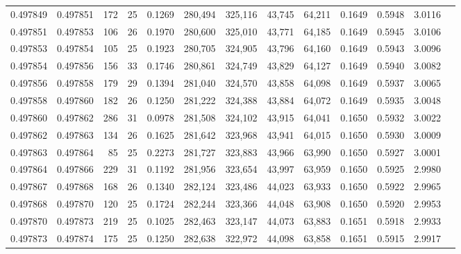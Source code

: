 \begin{tabular}{rrrrrrrrrrrrr}
0.497849 & 0.497851 & 172 &  25 &                                     0.1269 & 280,494 & 325,116 &  43,745 &  64,211 & 0.1649 & 0.5948 & 3.0116 \\
0.497851 & 0.497853 & 106 &  26 &                                     0.1970 & 280,600 & 325,010 &  43,771 &  64,185 & 0.1649 & 0.5945 & 3.0106 \\
0.497853 & 0.497854 & 105 &  25 &                                     0.1923 & 280,705 & 324,905 &  43,796 &  64,160 & 0.1649 & 0.5943 & 3.0096 \\
0.497854 & 0.497856 & 156 &  33 &                                     0.1746 & 280,861 & 324,749 &  43,829 &  64,127 & 0.1649 & 0.5940 & 3.0082 \\
0.497856 & 0.497858 & 179 &  29 &                                     0.1394 & 281,040 & 324,570 &  43,858 &  64,098 & 0.1649 & 0.5937 & 3.0065 \\
0.497858 & 0.497860 & 182 &  26 &                                     0.1250 & 281,222 & 324,388 &  43,884 &  64,072 & 0.1649 & 0.5935 & 3.0048 \\
0.497860 & 0.497862 & 286 &  31 &                                     0.0978 & 281,508 & 324,102 &  43,915 &  64,041 & 0.1650 & 0.5932 & 3.0022 \\
0.497862 & 0.497863 & 134 &  26 &                                     0.1625 & 281,642 & 323,968 &  43,941 &  64,015 & 0.1650 & 0.5930 & 3.0009 \\
0.497863 & 0.497864 &  85 &  25 &                                     0.2273 & 281,727 & 323,883 &  43,966 &  63,990 & 0.1650 & 0.5927 & 3.0001 \\
0.497864 & 0.497866 & 229 &  31 &                                     0.1192 & 281,956 & 323,654 &  43,997 &  63,959 & 0.1650 & 0.5925 & 2.9980 \\
0.497867 & 0.497868 & 168 &  26 &                                     0.1340 & 282,124 & 323,486 &  44,023 &  63,933 & 0.1650 & 0.5922 & 2.9965 \\
0.497868 & 0.497870 & 120 &  25 &                                     0.1724 & 282,244 & 323,366 &  44,048 &  63,908 & 0.1650 & 0.5920 & 2.9953 \\
0.497870 & 0.497873 & 219 &  25 &                                     0.1025 & 282,463 & 323,147 &  44,073 &  63,883 & 0.1651 & 0.5918 & 2.9933 \\
0.497873 & 0.497874 & 175 &  25 &                                     0.1250 & 282,638 & 322,972 &  44,098 &  63,858 & 0.1651 & 0.5915 & 2.9917 \\

\end{tabular}

